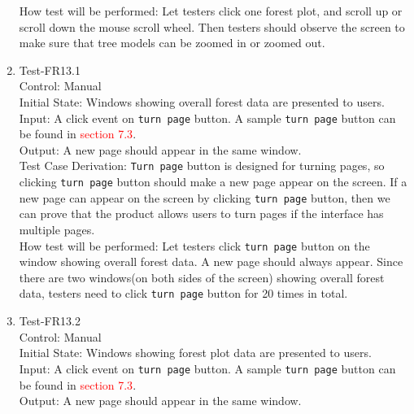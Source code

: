 \documentclass[12pt, titlepage]{article}
\begin{document}
\begin{enumerate}
How test will be performed:  Let testers click one forest plot, and scroll up or
scroll down the mouse scroll wheel. Then testers should observe the screen to make sure
that tree models can be zoomed in or zoomed out.

\item{Test-FR13.1\\}
Control: Manual\\ 

Initial State: Windows showing overall forest data are presented to users.\\

Input: A click event on \verb|turn page| button. A sample \verb|turn page| button
can be found in \textcolor{red}{section 7.3}.\\

Output: A new page should appear in the same window.\\

Test Case Derivation: \verb|Turn page| button is designed for turning pages, so 
clicking \verb|turn page| button should make a new page appear on the screen.  If 
a new page can appear on the screen by clicking \verb|turn page| button, then we can
prove that the product allows users to turn pages if the interface has multiple
pages.\\
					
How test will be performed:  Let testers click \verb|turn page| button on the window 
showing overall forest data. A new page should always appear. Since there are two
windows(on both sides of the screen) showing overall forest data, testers need to 
click \verb|turn page| button for 20 times in total.

\item{Test-FR13.2\\}
Control: Manual\\ 

Initial State: Windows showing forest plot data are presented to users.\\

Input: A click event on \verb|turn page| button. A sample \verb|turn page| button
can be found in \textcolor{red}{section 7.3}.\\

Output: A new page should appear in the same window.\\


\end{enumerate}
\end{document}
